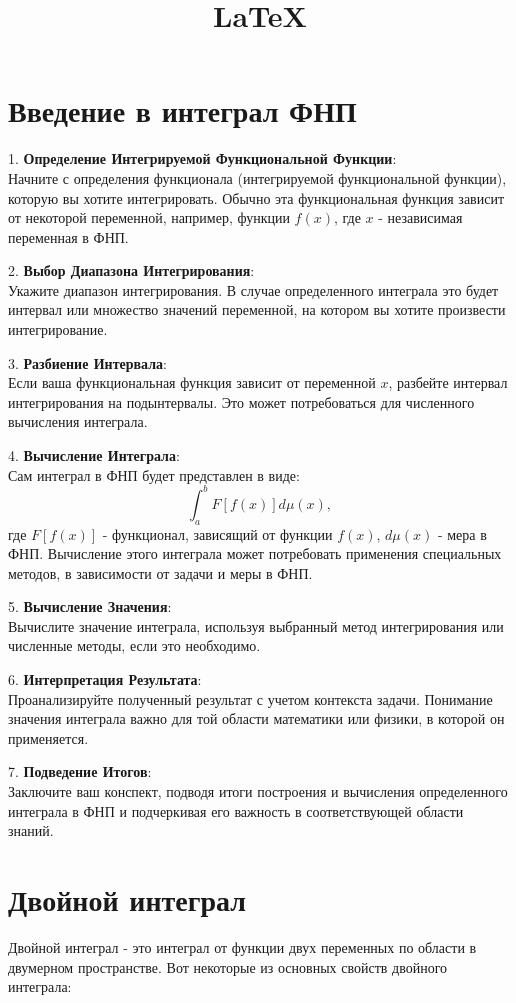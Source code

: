 \documentclass{article}
\title{\LaTeX}
\date{}
\author{}
\begin{document}
\maketitle
\section{Введение в интеграл ФНП}
1. \textbf{Определение Интегрируемой Функциональной Функции}: \\
   Начните с определения функционала (интегрируемой функциональной функции), которую вы хотите интегрировать. Обычно эта функциональная функция зависит от некоторой переменной, например, функции $f(x)$, где $x$ - независимая переменная в ФНП.

2. \textbf{Выбор Диапазона Интегрирования}: \\
   Укажите диапазон интегрирования. В случае определенного интеграла это будет интервал или множество значений переменной, на котором вы хотите произвести интегрирование.

3. \textbf{Разбиение Интервала}: \\
   Если ваша функциональная функция зависит от переменной $x$, разбейте интервал интегрирования на подынтервалы. Это может потребоваться для численного вычисления интеграла.

4. \textbf{Вычисление Интеграла}: \\
   Сам интеграл в ФНП будет представлен в виде:
   \[
   \int_{a}^{b} F[f(x)] d\mu(x),
   \]
   где $F[f(x)]$ - функционал, зависящий от функции $f(x)$, $d\mu(x)$ - мера в ФНП. Вычисление этого интеграла может потребовать применения специальных методов, в зависимости от задачи и меры в ФНП.

5. \textbf{Вычисление Значения}: \\
   Вычислите значение интеграла, используя выбранный метод интегрирования или численные методы, если это необходимо.

6. \textbf{Интерпретация Результата}: \\
   Проанализируйте полученный результат с учетом контекста задачи. Понимание значения интеграла важно для той области математики или физики, в которой он применяется.

7. \textbf{Подведение Итогов}: \\
   Заключите ваш конспект, подводя итоги построения и вычисления определенного интеграла в ФНП и подчеркивая его важность в соответствующей области знаний.

\section{Двойной интеграл}
Двойной интеграл - это интеграл от функции двух переменных по области в двумерном пространстве. Вот некоторые из основных свойств двойного интеграла:
\end{document}

